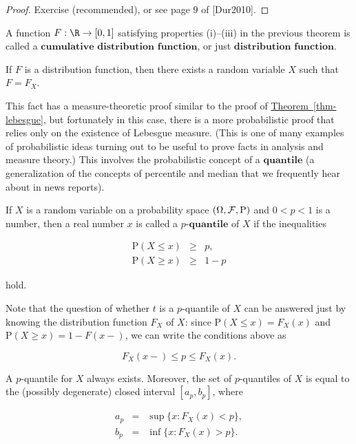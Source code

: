 \begin{proof}
Exercise (recommended), or see page 9 of [Dur2010].
\end{proof}

\begin{defn}
A function $F:\R\to[0,1]$ satisfying properties
(i)--(iii) in the previous theorem is called a
$\textbf{cumulative distribution function}$, or just
$\textbf{distribution function}$.
\end{defn}

\begin{thm}
\label{thm-rvexistence}
If $F$ is a distribution function, then there exists
a random variable $X$ such that $F=F_X$.
\end{thm}

\noindent This fact has a measure-theoretic proof similar to
the proof of \hyperref[thm-lebesgue]{Theorem~\ref*{thm-lebesgue}}, but fortunately
in this case, there is a more probabilistic proof that
relies only on the existence of Lebesgue measure.
(This is one of many examples of probabilistic ideas
turning out to be useful to prove facts in analysis
and measure theory.) This involves the probabilistic
concept of a $\textbf{quantile}$ (a generalization of
the concepts of percentile and median that we
frequently hear about in news reports).

\begin{defn}
If $X$ is a random variable on a probability space
$(\Omega, {\cal F}, \mathrm{P})$ and $0<p<1$ is a
number, then a real number $x$ is called a $\textbf{$p
$-quantile}$ of $X$ if the inequalities

\begin{eqnarray*}
\mathrm{P}(X \le x) &\ge& p, \\
\mathrm{P}(X \ge x) & \ge & 1-p
\end{eqnarray*}

\noindent hold.
\end{defn}

\noindent Note that the question of whether $t$ is a
$p$-quantile of $X$ can be answered just by knowing
the distribution function $F_X$ of $X$: since
$\mathrm{P}(X\le x)=F_X(x)$ and
$\mathrm{P}(X\ge x)=1-F(x-)$, we can write the
conditions above as

\[
F_X(x-) \le p \le F_X(x).
\]

\begin{lem}
\label{lem-quantile}
A $p$-quantile for $X$ always exists. Moreover, the
set of $p$-quantiles of $X$ is equal to the (possibly
degenerate) closed interval $[a_p, b_p]$, where

\begin{eqnarray*}
a_p &=& \sup \{ x : F_X(x) < p \}, \\
b_p &=& \inf \{ x : F_X(x) > p \}.
\end{eqnarray*}

\end{lem}

